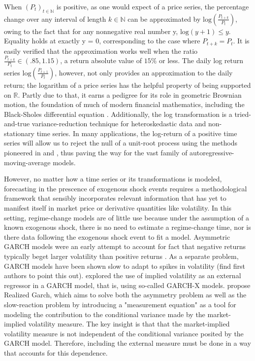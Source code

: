 \documentclass[11pt]{article}
\theoremstyle{definition}
\begin{document}
When $(P_{t})_{t\in\mathbb{N}}$ is positive, as one would expect of a price series, the percentage change over any interval of length $k\in\mathbb{N}$ can be approximated by $\text{log}(\frac{P_{t+k}}{P_{t}})$, owing to the fact that for any nonnegative real number y, $\text{log}(y+1)\leq y$.  Equality holds at exactly y = 0, corresponding to the case where $P_{t+k} = P_{t}$.  It is easily verified that the approximation works well when the ratio $\frac{P_{t+k}}{P_{t}} \in (.85,1.15)$, a return absolute value of $15\%$ or less.  The daily log return series $\text{log}(\frac{P_{t+1}}{P_{t}})$, however, not only provides an approximation to the daily return; the logarithm of a price series has the helpful property of being supported on $\mathbb{R}$.  Partly due to that, it earns a pedigree for its role in geometric Brownian motion, the foundation of much of modern financial mathematics, including the Black-Sholes differential equation \citep{tsay2005analysis}.  Additionally, the log transformation is a tried-and-true variance-reduction technique for heteroskedastic data \citep{faraway2016extending} and non-stationary time series.  In many applications, the log-return of a positive time series will allow us to reject the null of a unit-root process using the methods pioneered in \citet{dickey1979distribution} and \citet{dickey1981likelihood}, thus paving the way for the vast family of autoregressive-moving-average models.

However, no matter how a time series or its transformations is modeled, forecasting in the prescence of exogenous shock events requires a methodological framework that sensibly incorporates relevant information that has yet to manifest itself in market price or derivative quantities like volatility.  In this setting, regime-change models are of little use because under the assumption of a known exogenous shock, there is no need to estimate a regime-change time, nor is there data following the exogenous shock event to fit a model.  Asymmetric GARCH models were an early attempt to account for fact that negative returns typically beget larger volatility than positive returns \citep{hansen2012realized}.  As a separate problem, GARCH models have been shown slow to adapt to spikes in volatility (find first authors to point this out).  \citet{engle2002new} explored the use of implied volatility as an external regressor in a GARCH model, that is, using so-called GARCH-X models. \citet{hansen2012realized} propose Realized Garch, which aims to solve both the asymmetry problem as well as the slow-reaction problem by introducing a "measurement equation" as a tool for modeling the contribution to the conditional variance made by the market-implied volatility measure.  The key insight is that that the market-implied volatility measure is not independent of the conditional variance posited by the GARCH model.  Therefore, including the external measure must be done in a way that accounts for this dependence.
\end{document}
